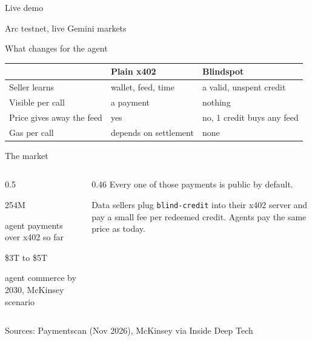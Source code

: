 \documentclass[aspectratio=169,12pt]{beamer}
\begin{document}
\begin{frame}
  \centering
  \vfill
  {\pixel\fontsize{34}{38}\selectfont\color{sand} Live demo\par}
  \medskip
  {\ttfamily\textcolor{sky}{Arc testnet, live Gemini markets}}
  \vfill
\end{frame}

\begin{frame}{What changes for the agent}
  \vspace{0.5cm}
  \small
  \renewcommand{\arraystretch}{1.25}
  \begin{tabular}{@{}>{\raggedright\arraybackslash}p{3.1cm}>{\raggedright\arraybackslash}p{3.1cm}>{\raggedright\arraybackslash}p{4.1cm}@{}}
    \toprule
    & \textcolor{sky}{Plain x402} & \textcolor{sand}{Blindspot} \\
    \midrule
    Seller learns & wallet, feed, time & a valid, unspent credit \\
    Visible per call & a payment & nothing \\
    Price gives away the feed & yes & no, 1 credit buys any feed \\
    Gas per call & depends on settlement & none \\
    \bottomrule
  \end{tabular}
\end{frame}

\begin{frame}{The market}
  \vspace{0.7cm}
  \begin{columns}[T,onlytextwidth]
    \begin{column}{0.5\textwidth}
      {\pixel\fontsize{30}{34}\selectfont\color{sand} 254M\par}
      {\ttfamily\small\textcolor{sky}{agent payments over x402 so far}}\par
      \bigskip
      {\pixel\fontsize{30}{34}\selectfont\color{sand} \$3T to \$5T\par}
      {\ttfamily\small\textcolor{sky}{agent commerce by 2030, McKinsey scenario}}
    \end{column}
    \begin{column}{0.46\textwidth}
      Every one of those payments is public by default.
      \medskip

      Data sellers plug \texttt{blind-credit} into their x402 server and pay a small fee per redeemed credit. Agents pay the same price as today.
    \end{column}
  \end{columns}
  \vfill
  {\ttfamily\tiny\textcolor{sky}{Sources: Paymentscan (Nov 2026), McKinsey via Inside Deep Tech}}
  \vspace{0.6cm}
\end{frame}
\end{document}
